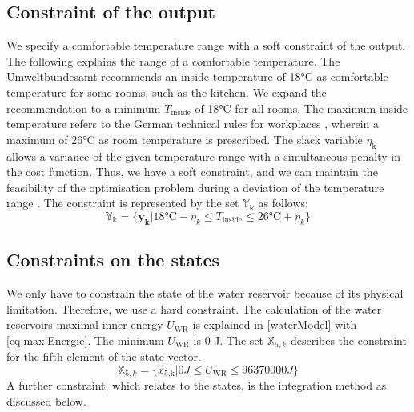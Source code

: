\subsection{Constraint of the output}
\label{subsec:constrainY}
We specify a comfortable temperature range with a soft constraint of the output. The following explains the range of a comfortable temperature.\newline
The Umweltbundesamt \cite{Umweltbundesamt.7.10.2021} recommends an inside temperature of 18°C as comfortable temperature for some rooms, such as the kitchen. We expand the recommendation to a minimum $T_\text{inside}$ of 18°C for all rooms. The maximum inside temperature refers to the German technical rules for workplaces \cite{Bund.2021}, wherein a maximum of 26°C as room temperature is prescribed. The slack variable $\eta_\text{k}$ allows a variance of the given temperature range with a simultaneous penalty in the cost function. Thus, we have a soft constraint, and we can maintain the feasibility of the optimisation problem during a deviation of the temperature range \cite{Drgona.2020}. The constraint is represented by the set $\mathbb{Y_k}$ as follows:  
\begin{equation}
    \label{ConstraintY}
    \mathbb{Y_k} = \{\mathbf{y_k}| 18 \text{°C} - \eta_k \leq T_\text{inside} \leq 26 \text{°C}+ \eta_k\} 
\end{equation}

\subsection{Constraints on the states}
\label{ConstraintX}
We only have to constrain the state of the water reservoir because of its physical limitation. Therefore, we use a hard constraint.
The calculation of the water reservoirs maximal inner energy $U_\text{WR}$ is explained in \autoref{waterModel} with \autoref{eq:max.Energie}. The minimum $U_\text{WR}$ is 0 J. The set $\mathbb{X}_{5,k}$ describes the constraint for the fifth element of the state vector.
\begin{equation}
    \label{ConstraintX5}
    \mathbb{X}_{5,k} = \{x_\text{5,k}| 0 J \leq U_\text{WR} \leq 96370000 J\} 
\end{equation}
A further constraint, which relates to the states, is the integration method as discussed below.


